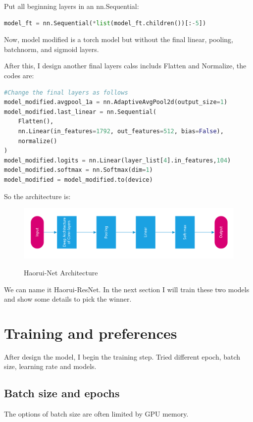 \documentclass{article}
\begin{document}
Put all beginning layers in an nn.Sequential:
\begin{lstlisting}[language=Python, caption=Keep the conv2d layers]
model_ft = nn.Sequential(*list(model_ft.children())[:-5])
\end{lstlisting}
Now, model modified is a torch model but without the final linear, pooling, batchnorm, and sigmoid layers.

After this, I design another final layers calss includs Flatten and Normalize, the codes are:
\begin{lstlisting}[language=Python, caption=Haorui Net]
#Change the final layers as follows
model_modified.avgpool_1a = nn.AdaptiveAvgPool2d(output_size=1)
model_modified.last_linear = nn.Sequential(
    Flatten(),
    nn.Linear(in_features=1792, out_features=512, bias=False),
    normalize()
)
model_modified.logits = nn.Linear(layer_list[4].in_features,104)
model_modified.softmax = nn.Softmax(dim=1)
model_modified = model_modified.to(device)
\end{lstlisting}
So the architecture is:
\begin{figure}[H]%
  \centering
  \caption{Haorui-Net Architecture}
  \includegraphics[width=\columnwidth]{IMG/haoruinet.png} %
  \label{Fig.RNN} %
\end{figure}

We can name it Haorui-ResNet. In the next section I will train these two models and show some details to pick the winner.

\section{Training and preferences}
After design the model, I begin the training step. Tried different epoch, batch size, learning rate and models.
\subsection{Batch size and epochs}
The options of batch size are often limited by GPU memory.
\end{document}
